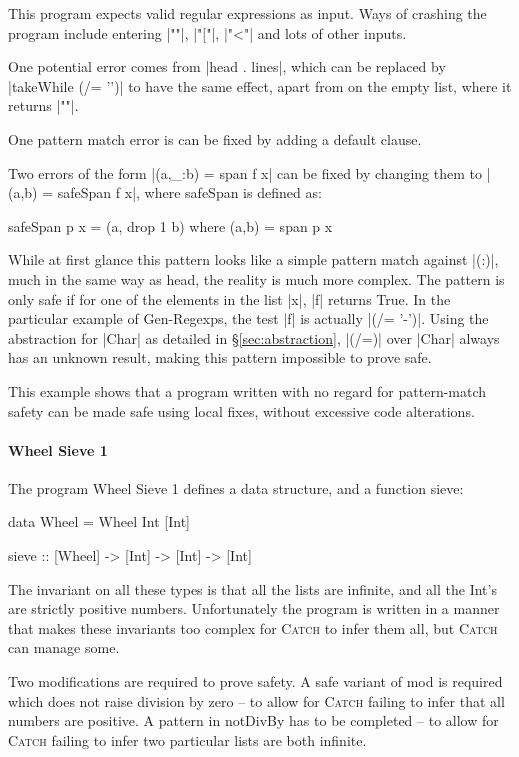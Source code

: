 \documentclass[preprint]{sigplanconf}
\newcommand{\C}[1]{\textsf{#1}}
\newcommand{\catch}{\textsc{Catch}}
\begin{document}
This program expects valid regular expressions as input. Ways of crashing the program include entering |""|, |"["|, |"<"| and lots of other inputs.

One potential error comes from |head . lines|, which can be replaced by |takeWhile (/= '\n')| to have the same effect, apart from on the empty list, where it returns |""|.

One pattern match error is can be fixed by adding a default clause.

Two errors of the form |(a,_:b) = span f x| can be fixed by changing them to |(a,b) = safeSpan f x|, where \C{safeSpan} is defined as:

\begin{code}
safeSpan p x = (a, drop 1 b)
    where (a,b) = span p x
\end{code}

While at first glance this pattern looks like a simple pattern match against |(:)|, much in the same way as \C{head}, the reality is much more complex. The pattern is only safe if for one of the elements in the list |x|, |f| returns True. In the particular example of Gen-Regexps, the test |f| is actually |(/= '-')|. Using the abstraction for |Char| as detailed in \S\ref{sec:abstraction}, |(/=)| over |Char| always has an unknown result, making this pattern impossible to prove safe.

This example shows that a program written with no regard for pattern-match safety can be made safe using local fixes, without excessive code alterations.

\paragraph{Wheel Sieve 1}

The program Wheel Sieve 1 defines a data structure, and a function \C{sieve}:

\begin{code}
data Wheel = Wheel Int [Int]

sieve :: [Wheel] -> [Int] -> [Int] -> [Int]
\end{code}

The invariant on all these types is that all the lists are infinite, and all the Int's are strictly positive numbers. Unfortunately the program is written in a manner that makes these invariants too complex for \catch{} to infer them all, but \catch{} can manage some.

Two modifications are required to prove safety. A safe variant of \C{mod} is required which does not raise division by zero -- to allow for \catch{} failing to infer that all numbers are positive. A pattern in \C{notDivBy} has to be completed -- to allow for \catch{} failing to infer two particular lists are both infinite.
\end{document}
